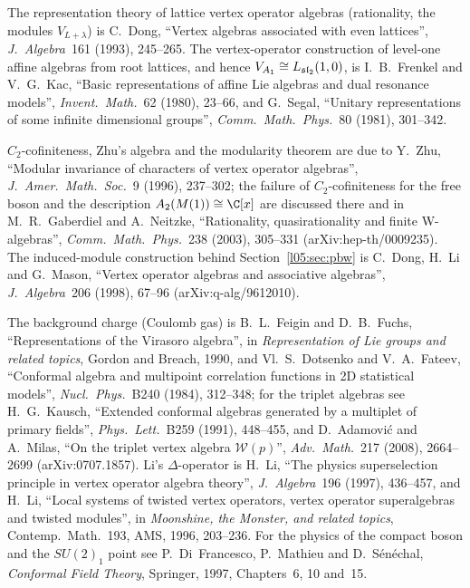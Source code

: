 The representation theory of lattice vertex operator algebras (rationality, the modules $V_{L+\lambda}$) is
C.~Dong, ``Vertex algebras associated with even lattices'', \emph{J.\ Algebra}~161 (1993), 245--265. The vertex-operator
construction of level-one affine algebras from root lattices, and hence $V_{A_1}\cong L_{\mathfrak{sl}_2}(1,0)$, is I.~B.~Frenkel and
V.~G.~Kac, ``Basic representations of affine Lie algebras and dual resonance models'', \emph{Invent.\ Math.}~62 (1980),
23--66, and G.~Segal, ``Unitary representations of some infinite dimensional groups'', \emph{Comm.\ Math.\ Phys.}~80 (1981),
301--342.

$C_2$-cofiniteness, Zhu's algebra and the modularity theorem are due to Y.~Zhu, ``Modular invariance of characters of vertex
operator algebras'', \emph{J.\ Amer.\ Math.\ Soc.}~9 (1996), 237--302; the failure of $C_2$-cofiniteness for the free boson and
the description $\lfiveA(M(1))\cong\C[x]$ are discussed there and in M.~R.~Gaberdiel and A.~Neitzke, ``Rationality,
quasirationality and finite W-algebras'', \emph{Comm.\ Math.\ Phys.}~238 (2003), 305--331 (arXiv:hep-th/0009235). The
induced-module construction behind Section~\ref{l05:sec:pbw} is C.~Dong, H.~Li and G.~Mason, ``Vertex operator algebras and
associative algebras'', \emph{J.\ Algebra}~206 (1998), 67--96 (arXiv:q-alg/9612010).

The background charge (Coulomb gas) is B.~L.~Feigin and D.~B.~Fuchs, ``Representations of the Virasoro algebra'', in
\emph{Representation of Lie groups and related topics}, Gordon and Breach, 1990, and Vl.~S.~Dotsenko and V.~A.~Fateev,
``Conformal algebra and multipoint correlation functions in 2D statistical models'', \emph{Nucl.\ Phys.}~B240 (1984),
312--348; for the triplet algebras see H.~G.~Kausch, ``Extended conformal algebras generated by a multiplet of primary
fields'', \emph{Phys.\ Lett.}~B259 (1991), 448--455, and D.~Adamovi\'c and A.~Milas, ``On the triplet vertex algebra
$\mathcal W(p)$'', \emph{Adv.\ Math.}~217 (2008), 2664--2699 (arXiv:0707.1857). Li's $\Delta$-operator is H.~Li,
``The physics superselection principle in vertex operator algebra theory'', \emph{J.\ Algebra}~196 (1997), 436--457, and
H.~Li, ``Local systems of twisted vertex operators, vertex operator superalgebras and twisted modules'', in
\emph{Moonshine, the Monster, and related topics}, Contemp.\ Math.~193, AMS, 1996, 203--236. For the physics of the
compact boson and the $SU(2)_1$ point see P.~Di~Francesco, P.~Mathieu and D.~S\'en\'echal, \emph{Conformal Field Theory},
Springer, 1997, Chapters~6, 10 and~15.
\endgroup

